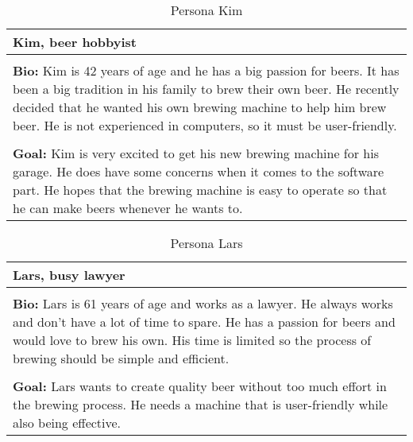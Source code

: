 \begin{table}[H]
    \begin{center}
        \begin{tabular}{|p{16cm}|}
            \hline
            \textbf{Kim, beer hobbyist}                                                                                                                                                                                                                        \\
            \hline
            \\ \textbf{Bio:} Kim is 42 years of age and he has a big passion for beers. It has been a big tradition in his family to brew their own beer. He recently decided that he wanted his own brewing machine to help him brew beer. He is not experienced in computers, so it must be user-friendly.  \\
            \\
            \textbf{Goal:} Kim is very excited to get his new brewing machine for his garage. He does have some concerns when it comes to the software part. He hopes that the brewing machine is easy to operate so that he can make beers whenever he wants to. \\
            \hline
        \end{tabular}
        \caption{Persona Kim}
        \label{tab:persona_kim}
    \end{center}
\end{table}

\begin{table}[H]
    \begin{center}
        \begin{tabular}{|p{16cm}|}
            \hline
            \textbf{Lars, busy lawyer}                                                                                                                                           \\
            \hline
            \\ \textbf{Bio:} Lars is 61 years of age and works as a lawyer. He always works and don't have a lot of time to spare. He has a passion for beers and would love to brew his own. His time is limited so the process of brewing should be simple and efficient.  \\
            \\
            \textbf{Goal:} Lars wants to create quality beer without too much effort in the brewing process. He needs a machine that is user-friendly while also being effective. \\
            \hline
        \end{tabular}
        \caption{Persona Lars}
        \label{tab:persona_lars}
    \end{center}
\end{table}

